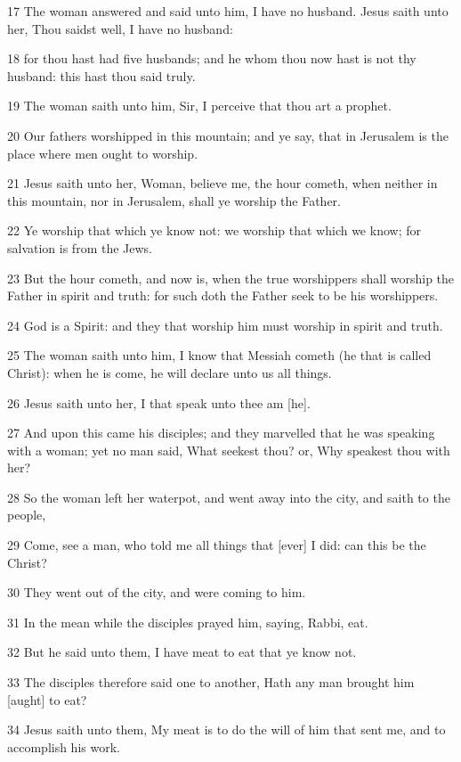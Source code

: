 \par 17 The woman answered and said unto him, I have no husband. Jesus saith unto her, Thou saidst well, I have no husband:
\par 18 for thou hast had five husbands; and he whom thou now hast is not thy husband: this hast thou said truly.
\par 19 The woman saith unto him, Sir, I perceive that thou art a prophet.
\par 20 Our fathers worshipped in this mountain; and ye say, that in Jerusalem is the place where men ought to worship.
\par 21 Jesus saith unto her, Woman, believe me, the hour cometh, when neither in this mountain, nor in Jerusalem, shall ye worship the Father.
\par 22 Ye worship that which ye know not: we worship that which we know; for salvation is from the Jews.
\par 23 But the hour cometh, and now is, when the true worshippers shall worship the Father in spirit and truth: for such doth the Father seek to be his worshippers.
\par 24 God is a Spirit: and they that worship him must worship in spirit and truth.
\par 25 The woman saith unto him, I know that Messiah cometh (he that is called Christ): when he is come, he will declare unto us all things.
\par 26 Jesus saith unto her, I that speak unto thee am [he].
\par 27 And upon this came his disciples; and they marvelled that he was speaking with a woman; yet no man said, What seekest thou? or, Why speakest thou with her?
\par 28 So the woman left her waterpot, and went away into the city, and saith to the people,
\par 29 Come, see a man, who told me all things that [ever] I did: can this be the Christ?
\par 30 They went out of the city, and were coming to him.
\par 31 In the mean while the disciples prayed him, saying, Rabbi, eat.
\par 32 But he said unto them, I have meat to eat that ye know not.
\par 33 The disciples therefore said one to another, Hath any man brought him [aught] to eat?
\par 34 Jesus saith unto them, My meat is to do the will of him that sent me, and to accomplish his work.

